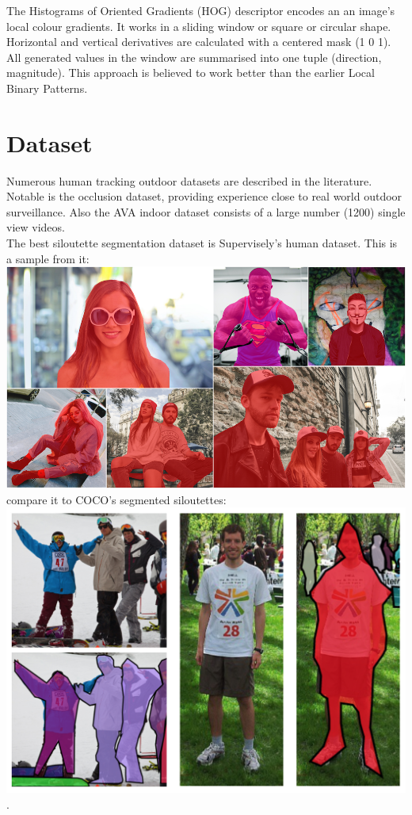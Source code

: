 \documentclass{article}
\begin{document}
The Histograms of Oriented Gradients (HOG)\cite{hog} descriptor encodes an an image's local colour gradients.
It works in a sliding window or square or circular shape.
Horizontal and vertical derivatives are calculated with a centered mask (1 0 1).
All generated values in the window are summarised into one tuple (direction, magnitude).
This approach is believed to work better than the earlier Local Binary Patterns.


\section{Dataset}
Numerous human tracking outdoor datasets are described in the literature\cite{datasets0}\cite{datasets1}.
Notable is the occlusion dataset\cite{datasets2}, providing experience close to real world outdoor surveillance.
Also the AVA indoor dataset\cite{ava} consists of a large number (1200) single view videos.
\\
The best siloutette segmentation dataset is Supervisely's human dataset\cite{supervisely}. This is a sample from it:
\\
\includegraphics[height=0.5\textwidth]{../img/supervisely}
\\
compare it to COCO's segmented siloutettes:
\\
\includegraphics[height=0.5\textheight]{../img/coco}.
\end{document}
